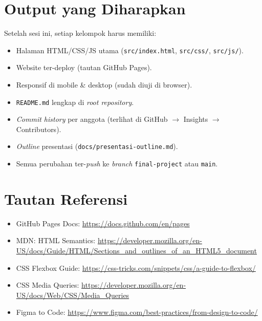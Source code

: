 \section{Output yang Diharapkan}
\label{sec:output-minggu-15}

Setelah sesi ini, setiap kelompok harus memiliki:
\begin{itemize}
  \item Halaman HTML/CSS/JS utama (\texttt{src/index.html}, \texttt{src/css/}, \texttt{src/js/}).
  \item Website ter-deploy (tautan GitHub Pages).
  \item Responsif di mobile \& desktop (sudah diuji di browser).
  \item \texttt{README.md} lengkap di \emph{root repository}.
  \item \emph{Commit history} per anggota (terlihat di GitHub $\rightarrow$ Insights $\rightarrow$ Contributors).
  \item \emph{Outline} presentasi (\texttt{docs/presentasi-outline.md}).
  \item Semua perubahan ter-\emph{push} ke \emph{branch} \texttt{final-project} atau \texttt{main}.
\end{itemize}

\section{Tautan Referensi}
\label{sec:referensi-minggu-15}

\begin{itemize}
  \item GitHub Pages Docs: \url{https://docs.github.com/en/pages}
  \item MDN: HTML Semantics: \url{https://developer.mozilla.org/en-US/docs/Guide/HTML/Sections_and_outlines_of_an_HTML5_document}
  \item CSS Flexbox Guide: \url{https://css-tricks.com/snippets/css/a-guide-to-flexbox/}
  \item CSS Media Queries: \url{https://developer.mozilla.org/en-US/docs/Web/CSS/Media_Queries}
  \item Figma to Code: \url{https://www.figma.com/best-practices/from-design-to-code/}
\end{itemize}


